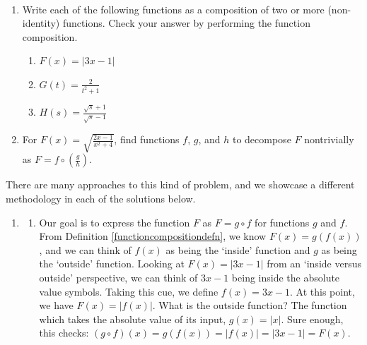 \documentclass{ximera}
\begin{document}
\begin{example}  \label{funccompdecompex} $~$

\begin{enumerate}

\item Write each of the following functions as a composition of two or more (non-identity) functions.  Check your answer by performing the function composition.

\begin{enumerate}

\item $F(x) = |3x-1|$

\item $G(t) = \frac{2}{t^2+1}$

\item  $H(s) = \frac{\sqrt{s}+1}{\sqrt{s}-1}$

\end{enumerate}


\item For $F(x) = \sqrt{\frac{2x-1}{x^2+4}}$, find functions $f$, $g$, and $h$ to decompose $F$ nontrivially as $F = f \circ \left(\frac{g}{h} \right)$.


\end{enumerate}

\begin{explanation} There are many approaches to this kind of problem, and we showcase a different methodology in each of the solutions below.

\begin{enumerate}

\item  \begin{enumerate}

\item  Our goal is to express the function $F$ as $F = g \circ f$ for functions $g$ and $f$.  From Definition \ref{functioncompositiondefn}, we know $F(x) = g(f(x))$, and we can think of $f(x)$ as being the `inside' function and $g$ as being the `outside' function.  Looking at $F(x) = |3x-1|$ from an `inside versus outside' perspective, we can think of $3x-1$ being inside the absolute value symbols.  Taking this cue, we define $f(x) = 3x-1$.  At this point, we have $F(x) = |f(x)|$.  What is the outside function?  The function which takes the absolute value of its input, $g(x) = |x|$. Sure enough,  this checks: $(g \circ f)(x) = g(f(x)) = |f(x)| = |3x-1| = F(x)$.


\end{enumerate}
\end{enumerate}
\end{explanation}
\end{example}
\end{document}

